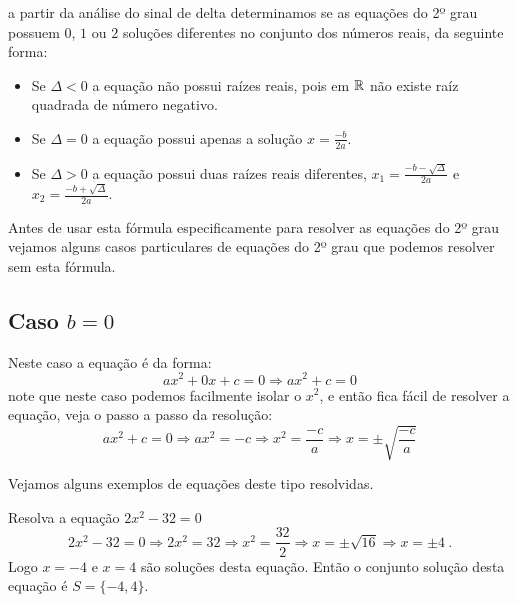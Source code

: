 
a partir da análise do sinal de delta determinamos se as equações do 2º grau possuem $0$, $1$ ou $2$ soluções diferentes no conjunto dos números reais, da seguinte forma:
\begin{itemize}
\item Se $\Delta < 0$ a equação não possui raízes reais, pois em $\mathbb{R}$ não existe raíz quadrada de número negativo.
\item Se $\Delta = 0$ a equação possui apenas a solução $x= \frac{-b}{2a}$.
\item Se $\Delta > 0$ a equação possui duas raízes reais diferentes, $x_1= \frac{-b - \sqrt{\Delta}}{2a}$ e $x_2= \frac{-b + \sqrt{\Delta}}{2a}$.
\end{itemize}


Antes de usar esta fórmula especificamente para resolver as equações do 2º grau vejamos alguns casos particulares de equações do 2º grau que podemos resolver sem esta fórmula.

 \subsection{Caso \texorpdfstring{$b=0$}{b=0}}

 Neste caso a equação é da forma:
\begin{equation}
ax^2 + 0x + c= 0 \Rightarrow ax^2 + c= 0
\end{equation}
 note que neste caso podemos facilmente isolar o $x^2$, e então fica fácil de resolver a equação, veja o passo a passo da resolução:
\begin{equation}
ax^2 + c= 0 \Rightarrow ax^2= -c \Rightarrow x^2= \frac{-c}{a} \Rightarrow x= \pm \sqrt{\frac{-c}{a}}
\end{equation}

 Vejamos alguns exemplos de equações deste tipo resolvidas.
 
 \begin{exem} 
 Resolva a equação $2x^2 - 32=0$
\begin{equation}
2x^2 - 32=0 \Rightarrow 2x^2= 32 \Rightarrow x^2= \frac{32}{2} \Rightarrow x= \pm \sqrt{16} \Rightarrow x= \pm 4 \ .
\end{equation}
 Logo $x= -4$ e $x= 4$ são soluções desta equação. Então o conjunto solução desta equação é $S= \{-4, 4\}$.
 \end{exem}
 
